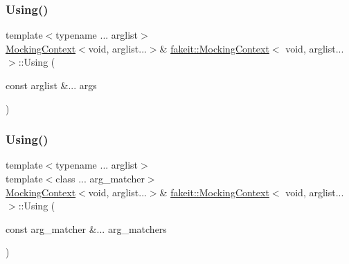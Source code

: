 \subsubsection{\texorpdfstring{Using()}{Using()}\hspace{0.1cm}{\footnotesize\ttfamily [6/18]}}
{\footnotesize\ttfamily template$<$typename ... arglist$>$ \\
\mbox{\hyperlink{classfakeit_1_1MockingContext}{Mocking\+Context}}$<$void, arglist...$>$\& \mbox{\hyperlink{classfakeit_1_1MockingContext}{fakeit\+::\+Mocking\+Context}}$<$ void, arglist... $>$\+::Using (\begin{DoxyParamCaption}\item[{const arglist \&...}]{args }\end{DoxyParamCaption})\hspace{0.3cm}{\ttfamily [inline]}}

\mbox{\label{classfakeit_1_1MockingContext_3_01void_00_01arglist_8_8_8_01_4_aaab0ad3883ab87bd3885671e3266546e}} 
\subsubsection{\texorpdfstring{Using()}{Using()}\hspace{0.1cm}{\footnotesize\ttfamily [7/18]}}
{\footnotesize\ttfamily template$<$typename ... arglist$>$ \\
template$<$class ... arg\+\_\+matcher$>$ \\
\mbox{\hyperlink{classfakeit_1_1MockingContext}{Mocking\+Context}}$<$void, arglist...$>$\& \mbox{\hyperlink{classfakeit_1_1MockingContext}{fakeit\+::\+Mocking\+Context}}$<$ void, arglist... $>$\+::Using (\begin{DoxyParamCaption}\item[{const arg\+\_\+matcher \&...}]{arg\+\_\+matchers }\end{DoxyParamCaption})\hspace{0.3cm}{\ttfamily [inline]}}

\mbox{\label{classfakeit_1_1MockingContext_3_01void_00_01arglist_8_8_8_01_4_aaab0ad3883ab87bd3885671e3266546e}} 
